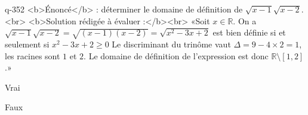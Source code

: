 \begin{truefalse}{q-352}
<b>Énoncé</b> : déterminer le domaine de définition de $\sqrt{x-1}\sqrt{x-2}$.<br> <b>Solution rédigée à évaluer :</b><br>  «Soit $x\in\mathbb{R}$. On a $\sqrt{x-1}\sqrt{x-2}=\sqrt{(x-1)(x-2)}=\sqrt{x^2-3x+2}$ est bien définie si et seulement si $x^2-3x+2\geq0$ Le discriminant du trinôme vaut $\Delta = 9-4\times2=1$, les racines sont $1$ et $2$. Le domaine de définition de l'expression est donc $\mathbb{R}\setminus [1,2]$.»
\item Vrai
\item* Faux
\end{truefalse}

